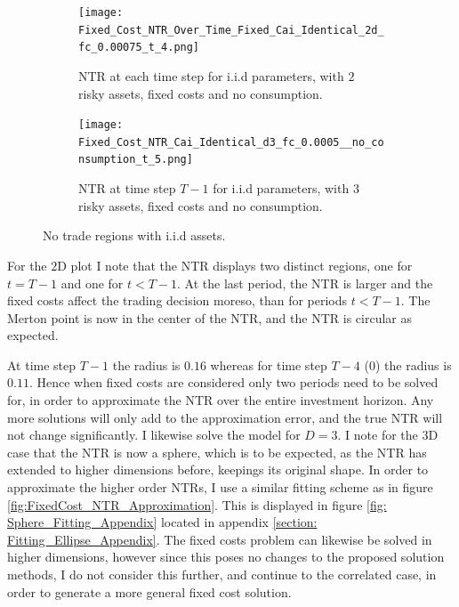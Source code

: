 \documentclass[11pt]{article}
\begin{document}
\begin{figure}[!ht]
    \centering
    \begin{subfigure}[t]{0.48\textwidth}
        \centering
        \texttt{[image: Fixed\_Cost\_NTR\_Over\_Time\_Fixed\_Cai\_Identical\_2d\_fc\_0.00075\_t\_4.png]}
        \caption{NTR at each time step for i.i.d parameters, with $2$ risky assets, fixed costs and no consumption.}
        \label{fig:Fixed_NTR_2d_iid_over_time}
    
    \end{subfigure}%
    \hfill
    \begin{subfigure}[t]{0.48\textwidth}
        \centering
        \texttt{[image: Fixed\_Cost\_NTR\_Cai\_Identical\_d3\_fc\_0.0005\_\_no\_consumption\_t\_5.png]}
        \caption{NTR at time step $T-1$ for i.i.d parameters, with $3$ risky assets, fixed costs and no consumption.}
        \label{fig:NTR_3d_iid_T-1}
    \end{subfigure}
    \caption{No trade regions with i.i.d assets.}
\end{figure}
For the $2$D plot I note that the NTR displays two distinct regions, one for $t = T-1$ and one for $t < T-1$.
At the last period, the NTR is larger and the fixed costs affect the trading decision moreso, than for periods $t < T-1$.
The Merton point is now in the center of the NTR, and the NTR is circular as expected.

At time step $T-1$ the radius is $0.16$ whereas for time step $T-4$ ($0$) the radius is $0.11$.
Hence when fixed costs are considered only two periods need to be solved for, in order to approximate the NTR over the entire investment horizon.
Any more solutions will only add to the approximation error, and the true NTR will not change significantly.
I likewise solve the model for $D=3$.
I note for the $3$D case that the NTR is now a sphere, which is to be expected, as the NTR has extended to higher dimensions before, keepings its original shape.
In order to approximate the higher order \ac{NTR}s, I use a similar fitting scheme as in figure \ref{fig:FixedCost_NTR_Approximation}.
This is displayed in figure \ref{fig: Sphere_Fitting_Appendix} located in appendix \ref{section: Fitting_Ellipse_Appendix}.
The fixed costs problem can likewise be solved in higher dimensions, however since this poses no changes to the proposed solution methods,
I do not consider this further, and continue to the correlated case, in order to generate a more general fixed cost solution.
\end{document}

